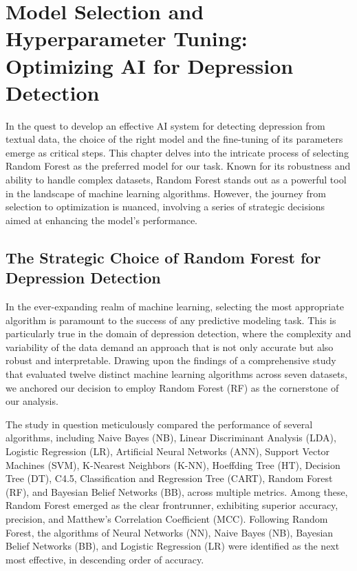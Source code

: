 \chapter{Model Selection and Hyperparameter Tuning: Optimizing AI for Depression Detection}

\label{chap:ch3}

\quad In the quest to develop an effective AI system for detecting depression from textual data, the choice of the right model and the fine-tuning of its parameters emerge as critical steps. This chapter delves into the intricate process of selecting Random Forest as the preferred model for our task. Known for its robustness and ability to handle complex datasets, Random Forest stands out as a powerful tool in the landscape of machine learning algorithms. However, the journey from selection to optimization is nuanced, involving a series of strategic decisions aimed at enhancing the model's performance.

\section{The Strategic Choice of Random Forest for Depression Detection}

In the ever-expanding realm of machine learning, selecting the most appropriate algorithm is paramount to the success of any predictive modeling task. This is particularly true in the domain of depression detection, where the complexity and variability of the data demand an approach that is not only accurate but also robust and interpretable. Drawing upon the findings of a comprehensive study that evaluated twelve distinct machine learning algorithms across seven datasets\cite{siraj2023performanceModelComparison}, we anchored our decision to employ Random Forest (RF) as the cornerstone of our analysis.

The study \cite{siraj2023performanceModelComparison} in question meticulously compared the performance of several algorithms, including Naive Bayes (NB), Linear Discriminant Analysis (LDA), Logistic Regression (LR), Artificial Neural Networks (ANN), Support Vector Machines (SVM), K-Nearest Neighbors (K-NN), Hoeffding Tree (HT), Decision Tree (DT), C4.5, Classification and Regression Tree (CART), Random Forest (RF), and Bayesian Belief Networks (BB), across multiple metrics. Among these, Random Forest emerged as the clear frontrunner, exhibiting superior accuracy, precision, and Matthew’s Correlation Coefficient (MCC). Following Random Forest, the algorithms of Neural Networks (NN), Naive Bayes (NB), Bayesian Belief Networks (BB), and Logistic Regression (LR) were identified as the next most effective, in descending order of accuracy.


